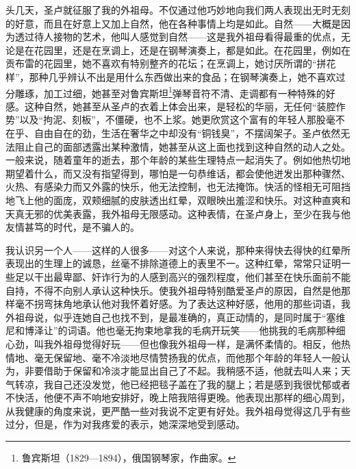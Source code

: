 \par 头几天，圣卢就征服了我的外祖母。不仅通过他巧妙地向我们两人表现出无时无刻的好意，而且在好意上又加上自然，他在各种事情上均是如此。自然——大概是因为透过待人接物的艺术，他叫人感觉到自然——这是我外祖母看得最重的优点，无论是在花园里，还是在烹调上，还是在钢琴演奏上，都是如此。在花园里，例如在贡布雷的花园里，她不喜欢有特别整齐的花坛；在烹调上，她讨厌所谓的“拼花样”，那种几乎辨认不出是用什么东西做出来的食品；在钢琴演奏上，她不喜欢过分雕琢，加工过细，她甚至对鲁宾斯坦\footnote{鲁宾斯坦（1829—1894），俄国钢琴家，作曲家。}弹琴音符不清、走调都有一种特殊的好感。这种自然，她甚至从圣卢的衣着上体会出来，是轻松的华丽，无任何“装腔作势”以及“拘泥、刻板”，不僵硬，也不上浆。她更欣赏这个富有的年轻人那股毫不在乎、自由自在的劲，生活在奢华之中却没有“铜钱臭”，不摆阔架子。圣卢依然无法阻止自己的面部透露出某种激情，她甚至从这上面也找到这种自然的动人之处。一般来说，随着童年的逝去，那个年龄的某些生理特点一起消失了。例如他热切地期望着什么，而又没有指望得到，哪怕是一句恭维话，都会使他迸发出那种骤然、火热、有感染力而又外露的快乐，他无法控制，也无法掩饰。快活的怪相无可阻挡地飞上他的面庞，双颊细腻的皮肤透出红晕，双眼映出羞涩和快乐。对这种直爽和天真无邪的优美表露，我外祖母无限感动。这种表情，在圣卢身上，至少在我与他友情甚笃的时代，是不骗人的。
\par 我认识另一个人——这样的人很多——对这个人来说，那种来得快去得快的红晕所表现出的生理上的诚恳，丝毫不排除道德上的表里不一。这种红晕，常常只证明一些足以干出最卑鄙、奸诈行为的人感到高兴的强烈程度，他们甚至在快乐面前不能自持，不得不向别人承认这种快乐。使我外祖母特别酷爱圣卢的原因，自然是他那样毫不拐弯抹角地承认他对我怀着好感。为了表达这种好感，他用的那些词语，我外祖母说，似乎连她自己也找不到，是最准确的，真正动情的，是同时属于“塞维尼和博泽让”的词语。他也毫无拘束地拿我的毛病开玩笑——他挑我的毛病那种细心劲，叫我外祖母觉得好玩——但也像我外祖母一样，是满怀柔情的。相反，他热情地、毫无保留地、毫不冷淡地尽情赞扬我的优点，而他那个年龄的年轻人一般认为，非要借助于保留和冷淡才能显出自己了不起。我稍感不适，他就去叫人来；天气转凉，我自己还没发觉，他已经把毯子盖在了我的腿上；若是感到我很忧郁或者不快活，他便不声不响地安排好，晚上陪我陪得更晚。他表现出那样的细心周到，从我健康的角度来说，更严酷一些对我说不定更有好处。我外祖母觉得这几乎有些过分，但是，作为对我疼爱的表示，她深深地受到感动。

